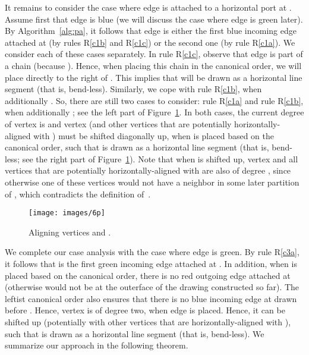 \documentclass[a4paper,twoside,11pt]{article}
\begin{document}
It remains to consider the case where edge  is attached to a
horizontal port at . Assume first that edge  is blue (we
will discuss the case where edge  is green later). By
Algorithm~\ref{alg:pa}, it follows that edge  is either the
first blue incoming edge attached at  (by rules R\ref{c1b} and
R\ref{c1c}) or the second one (by rule R\ref{c1a}). We consider each
of these cases separately. In rule R\ref{c1c}, observe that edge
 is part of a chain (because ). Hence, when
placing this chain in the canonical order, we will place 
directly to the right of . This implies that  will be
drawn as a horizontal line segment (that is, bend-less). Similarly,
we cope with rule R\ref{c1b}, when additionally .
So, there are still two cases to consider: rule R\ref{c1a} and rule
R\ref{c1b}, when additionally ; see the left part
of Figure~\ref{fig:blueconfiguration}. In both cases, the current
degree of vertex  is  and vertex  (and other vertices that
are potentially horizontally-aligned with ) must be shifted
diagonally up, when  is placed based on the canonical order, such
that  is drawn as a horizontal line segment (that is,
bend-less; see the right part of
Figure~\ref{fig:blueconfiguration}). Note that when  is shifted
up, vertex  and all vertices that are potentially
horizontally-aligned with  are also of degree , since
otherwise one of these vertices would not have a neighbor in some
later partition of , which contradicts the definition of~.

\begin{figure}[t!]
    \centering
    \texttt{[image: images/6p]}
    \caption{Aligning vertices  and .}
    \label{fig:blueconfiguration}
\end{figure}

We complete our case analysis with the case where edge  is
green. By rule R\ref{c3a}, it follows that  is the first
green incoming edge attached at . In addition, when  is
placed based on the canonical order, there is no red outgoing edge
attached at  (otherwise  would not be at the outerface of the
drawing constructed so far). The leftist canonical order also
ensures that there is no blue incoming edge at  drawn before
. Hence, vertex  is of degree two, when edge  is
placed. Hence, it can be shifted up (potentially with other vertices
that are horizontally-aligned with ), such that  is drawn
as a horizontal line segment (that is, bend-less). We summarize our
approach in the following theorem.
\end{document}
